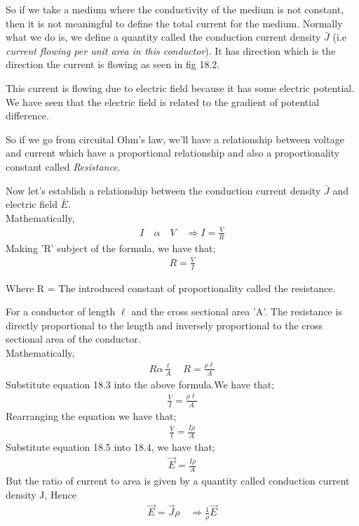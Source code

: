 So if we take a medium where the conductivity of the medium is not constant, then it is not meaningful to define the total current for the medium. Normally what we do is, we define a quantity called the conduction current density $ \bar{J} $ (i.e \emph{current flowing per unit area in this conductor}). It has direction which is the direction the current is flowing as seen in fig 18.2. 

This current is flowing due to electric field because it has some electric potential. We have seen that the electric field is related to the gradient of potential difference.

So if we go from circuital Ohm's law, we'll have a relationship between voltage and current which have a proportional relationship and also a proportionality constant called \emph{Resistance}.

Now let's establish a relationship between the conduction current density $ \bar{J} $ and electric field $ \bar{E} $. \\
Mathematically, 
\begin{align*}
I\quad\alpha\quad V \quad\Rightarrow I = \frac{V}{R}
\end{align*} 
Making 'R' subject of the formula, we have that; 
\begin{align}
R =  \frac{V}{I}
\end{align}
\begin{center}
Where R = The introduced constant of proportionality called the resistance.
\end{center}
For a conductor of length $\ell$ and the cross sectional area 'A'. The resistance is directly proportional to the length and inversely proportional to the cross sectional area of the conductor. \\
Mathematically, 
\begin{align*}
R \alpha \frac{\ell}{A}\quad R = \frac{\rho\ell}{A}
\end{align*}
Substitute equation 18.3 into the above formula.We have that;
\begin{align*}
\frac{V}{I} = \frac{\rho\ell}{A}
\end{align*}
Rearranging the equation we have that; 
\begin{align}
\frac{V}{\ell} = \frac{I\rho}{A}
\end{align}
Substitute equation 18.5 into 18.4, we have that;
\begin{align*}
\vec{E} = \frac{I\rho}{A}
\end{align*}
But the ratio of current to area is given by a quantity called conduction current density J, Hence
\begin{align*}
\vec{E} = \vec{J}\rho \quad \Rightarrow \frac{1}{\rho}\vec{E}
\end{align*}

